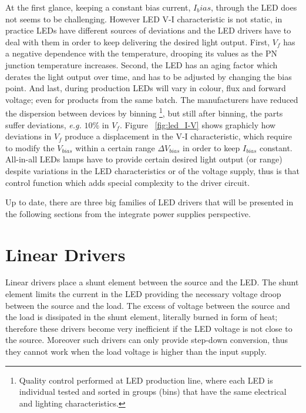 At the first glance, keeping a constant bias current, $I_bias$, through the LED does not seems to be challenging. However LED V-I characteristic is not static, in practice LEDs have different sources of deviations and the LED drivers have to deal with them in order to keep delivering the desired light output. First, $V_f$ has a negative dependence with the temperature, drooping its values as the PN junction temperature increases. Second, the LED has an aging factor which derates the light output over time, and has to be adjusted by changing the bias point. And last, during production LEDs will vary in colour, flux and forward voltage; even for products from the same batch. The manufacturers have reduced the dispersion between devices by binning \footnote{Quality control performed at LED production line, where each LED is individual tested and sorted in groups (bins) that have the same electrical and lighting characteristics.}, but still after binning, the parts suffer deviations, \emph{e.g.} $10\%$ in $V_f$. Figure ~\ref{fig:led_I-V} shows graphicly how deviations in $V_f$ produce a displacement in the V-I characteristic,  which require to modify the $V_{bias}$ within a certain range $\Delta V_{bias}$ in order to keep $I_{bias}$ constant. All-in-all LEDs lamps have to
provide certain desired light output (or range) despite variations in the LED characteristics or of the voltage supply, thus is that control function which adds special complexity to the driver circuit.


Up to date, there are three big families of LED drivers that will be presented in the following sections from the integrate power supplies perspective.

\section{Linear Drivers}

Linear drivers place a shunt element between the source and the LED. The shunt element limits the current in the LED providing the necessary voltage droop between the source and the load. The excess of voltage between the source and the load is dissipated in the shunt element, literally burned in form of heat; therefore these drivers become very inefficient if the LED voltage is not close to the source. Moreover such drivers can only provide step-down conversion, thus they cannot work when the load voltage is higher than the input supply.

